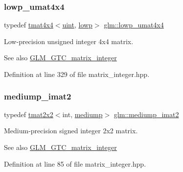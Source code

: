 \subsubsection{\texorpdfstring{lowp\_umat4x4}{lowp\_umat4x4}}
{\footnotesize\ttfamily typedef \mbox{\hyperlink{structglm_1_1tmat4x4}{tmat4x4}}$<$\mbox{\hyperlink{group__core__precision_ga4fd29415871152bfb5abd588334147c8}{uint}}, \mbox{\hyperlink{namespaceglm_a0f04f086094c747d227af4425893f545ae161af3fc695e696ce3bf69f7332bc2d}{lowp}}$>$ \mbox{\hyperlink{group__gtc__matrix__integer_ga6ec13ea43b4328e29219f8515c188997}{glm\+::lowp\+\_\+umat4x4}}}

Low-\/precision unsigned integer 4x4 matrix. \begin{DoxySeeAlso}{See also}
\mbox{\hyperlink{group__gtc__matrix__integer}{G\+L\+M\+\_\+\+G\+T\+C\+\_\+matrix\+\_\+integer}} 
\end{DoxySeeAlso}


Definition at line 329 of file matrix\+\_\+integer.\+hpp.

\mbox{\label{group__gtc__matrix__integer_gae812330b83568359273b6ec96b002863}} 
\subsubsection{\texorpdfstring{mediump\_imat2}{mediump\_imat2}}
{\footnotesize\ttfamily typedef \mbox{\hyperlink{structglm_1_1tmat2x2}{tmat2x2}}$<$int, \mbox{\hyperlink{namespaceglm_a0f04f086094c747d227af4425893f545a6416f3ea0c9025fb21ed50c4d6620482}{mediump}}$>$ \mbox{\hyperlink{group__gtc__matrix__integer_gae812330b83568359273b6ec96b002863}{glm\+::mediump\+\_\+imat2}}}

Medium-\/precision signed integer 2x2 matrix. \begin{DoxySeeAlso}{See also}
\mbox{\hyperlink{group__gtc__matrix__integer}{G\+L\+M\+\_\+\+G\+T\+C\+\_\+matrix\+\_\+integer}} 
\end{DoxySeeAlso}


Definition at line 85 of file matrix\+\_\+integer.\+hpp.

\mbox{\label{group__gtc__matrix__integer_ga52a40f2f95562746fd8084726a300963}} 
